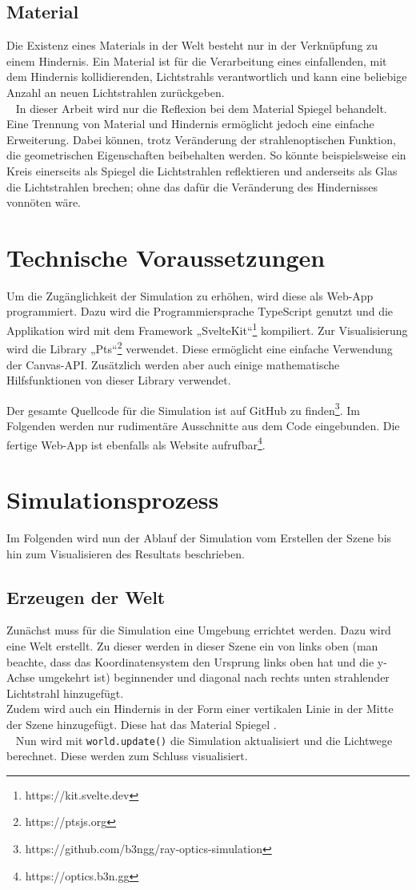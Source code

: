 \section{Material}
\label{material}
Die Existenz eines Materials  in der Welt besteht nur in der Verknüpfung zu einem Hindernis. 
Ein Material ist für die Verarbeitung eines einfallenden, mit dem Hindernis kollidierenden, Lichtstrahls verantwortlich 
und kann eine beliebige Anzahl an neuen Lichtstrahlen zurückgeben. \\ 
In dieser Arbeit wird nur die Reflexion bei dem Material Spiegel  behandelt. 
Eine Trennung von Material und Hindernis ermöglicht jedoch eine einfache Erweiterung.
Dabei können, trotz Veränderung der strahlenoptischen Funktion, die geometrischen Eigenschaften beibehalten werden.
So könnte beispielsweise ein Kreis einerseits als Spiegel die Lichtstrahlen reflektieren 
und anderseits als Glas die Lichtstrahlen brechen; ohne das dafür die Veränderung des Hindernisses vonnöten wäre.


\chapter{Technische Voraussetzungen}
Um die Zugänglichkeit der Simulation zu erhöhen, wird diese als Web-App programmiert. 
Dazu wird die Programmiersprache TypeScript genutzt und die Applikation wird mit dem Framework „SvelteKit“\footnote{https://kit.svelte.dev} kompiliert.
Zur Visualisierung wird die Library „Pts“\footnote{https://ptsjs.org} verwendet. Diese ermöglicht eine einfache Verwendung der Canvas-API. 
Zusätzlich werden aber auch einige mathematische Hilfsfunktionen von dieser Library verwendet.

Der gesamte Quellcode für die Simulation ist auf GitHub zu finden\footnote{https://github.com/b3ngg/ray-optics-simulation}. 
Im Folgenden werden nur rudimentäre Ausschnitte aus dem Code eingebunden. 
Die fertige Web-App ist ebenfalls als Website aufrufbar\footnote{https://optics.b3n.gg}.


\chapter{Simulationsprozess}
Im Folgenden wird nun der Ablauf der Simulation vom Erstellen der Szene bis hin zum Visualisieren des Resultats beschrieben.

\section{Erzeugen der Welt}
Zunächst muss für die Simulation eine Umgebung errichtet werden. Dazu wird eine Welt erstellt.
Zu dieser werden in dieser Szene ein von links oben (man beachte, dass das Koordinatensystem den 
Ursprung links oben hat und die y-Achse umgekehrt ist) beginnender und diagonal nach rechts 
unten strahlender Lichtstrahl hinzugefügt. \\
Zudem wird auch ein Hindernis in der Form einer vertikalen Linie in der Mitte der Szene hinzugefügt. 
Diese hat das Material Spiegel . \\ 
Nun wird mit \texttt{world.update()} die Simulation aktualisiert und die Lichtwege berechnet. Diese werden zum Schluss visualisiert.

